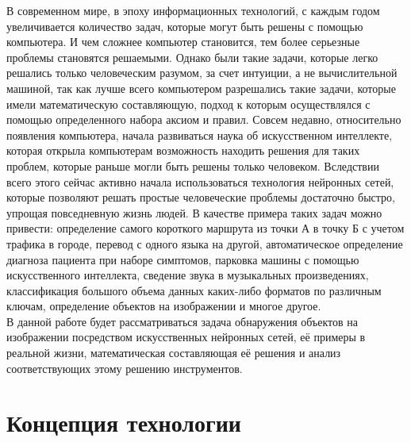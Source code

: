\documentclass[bachelor, och, coursework]{shiza}
\begin{document}


\tableofcontents

\intro

    В современном мире, в эпоху информационных технологий, с каждым годом увеличивается количество задач, которые могут быть решены с помощью компьютера. И чем сложнее компьютер становится, тем более серьезные проблемы становятся решаемыми. Однако были такие задачи, которые легко решались только человеческим разумом, за счет интуиции, а не вычислительной машиной, так как лучше всего компьютером разрешались такие задачи, которые имели математическую составляющую, подход к которым осуществлялся с помощью определенного набора аксиом и правил. Совсем недавно, относительно появления компьютера, начала развиваться наука об искусственном интеллекте, которая открыла компьютерам возможность находить решения для таких проблем, которые раньше могли быть решены только человеком. Вследствии всего этого сейчас активно начала использоваться технология нейронных сетей, которые позволяют решать простые человеческие проблемы достаточно быстро, упрощая повседневную жизнь людей. В качестве примера таких задач можно привести: определение самого короткого маршрута из точки А в точку Б с учетом трафика в городе, перевод с одного языка на другой, автоматическое определение диагноза пациента при наборе симптомов, парковка машины с помощью искусственного интеллекта, сведение звука в музыкальных произведениях, классификация большого объема данных каких-либо форматов по различным ключам, определение объектов на изображении и многое другое.\\
    В данной работе будет рассматриваться задача обнаружения объектов на изображении посредством искусственных нейронных сетей, её примеры в реальной жизни, математическая составляющая её решения и анализ соответствующих этому решению инструментов.

\section{Концепция технологии}
\end{document}
